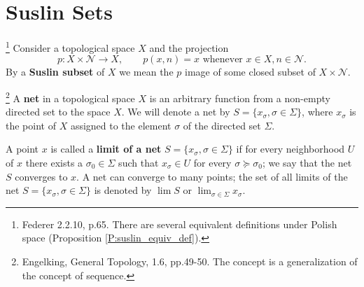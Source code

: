 \section{Suslin Sets}

\begin{definition} \label{D:suslin_set}
\footnote{Federer 2.2.10, p.65. There are several equivalent definitions
under Polish space (Proposition \ref{P:suslin_equiv_def}).}
Consider a topological space $X$ and the projection
\[
	p: X\times \mathcal{N} \to X, \qquad 
	\text{$p(x,n) = x$ whenever $x\in X, n\in\mathcal{N}$}.
\]
By a \textbf{Suslin subset}
of $X$ we mean the $p$ image of some closed subset of $X\times \mathcal{N}$.
\end{definition}

\begin{definition}
\footnote{Engelking, General Topology, 1.6, pp.49-50. The concept is a
  generalization of the concept of sequence.}
A \textbf{net} 
in a topological space $X$ is an arbitrary function from a non-empty directed
set to the space $X$. We will denote a net by 
$S=\{x_{\sigma}, \sigma\in\Sigma\}$, where $x_{\sigma}$ is the point of $X$
assigned to the element $\sigma$ of the directed set $\Sigma$.

A point $x$ is called a \textbf{limit of a net}
$S=\{x_{\sigma}, \sigma\in\Sigma\}$ if for every neighborhood $U$ of $x$ there
exists a $\sigma_0\in\Sigma$ such that $x_{\sigma}\in U$ for every 
$\sigma\succeq\sigma_0$; we say that the net $S$ converges to $x$. A net can
converge to many points; the set of all limits of the net
$S=\{x_{\sigma}, \sigma\in\Sigma\}$ is denoted by $\lim S$ or
$\lim_{\sigma\in\Sigma} x_{\sigma}$. 
\end{definition}

